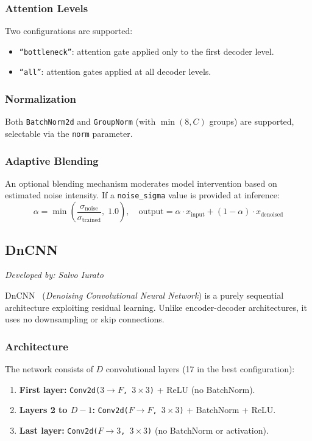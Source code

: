 \subsubsection{Attention Levels}
Two configurations are supported:
\begin{itemize}
    \item \texttt{``bottleneck''}: attention gate applied only to the first decoder level.
    \item \texttt{``all''}: attention gates applied at all decoder levels.
\end{itemize}

\subsubsection{Normalization}
Both \texttt{BatchNorm2d} and \texttt{GroupNorm} (with $\min(8, C)$ groups) are supported, selectable via the \texttt{norm} parameter.

\subsubsection{Adaptive Blending}
An optional blending mechanism moderates model intervention based on estimated noise intensity. If a \texttt{noise\_sigma} value is provided at inference:
\begin{equation}
\alpha = \min\!\left(\frac{\sigma_{\text{noise}}}{\sigma_{\text{trained}}},\; 1.0\right), \quad
\text{output} = \alpha \cdot x_{\text{input}} + (1 - \alpha) \cdot x_{\text{denoised}}
\end{equation}

\subsection{DnCNN}
\label{subsec:dncnn}

\textit{Developed by: Salvo Iurato}

\medskip

DnCNN~\cite{dncnn} (\textit{Denoising Convolutional Neural Network}) is a purely sequential architecture exploiting residual learning. Unlike encoder-decoder architectures, it uses no downsampling or skip connections.

\subsubsection{Architecture}
The network consists of $D$ convolutional layers (17 in the best configuration):
\begin{enumerate}
    \item \textbf{First layer:} \texttt{Conv2d($3 \!\to\! F$, $3\!\times\!3$)} + ReLU (no BatchNorm).
    \item \textbf{Layers 2 to $D\!-\!1$:} \texttt{Conv2d($F \!\to\! F$, $3\!\times\!3$)} + BatchNorm + ReLU.
    \item \textbf{Last layer:} \texttt{Conv2d($F \!\to\! 3$, $3\!\times\!3$)} (no BatchNorm or activation).
\end{enumerate}

